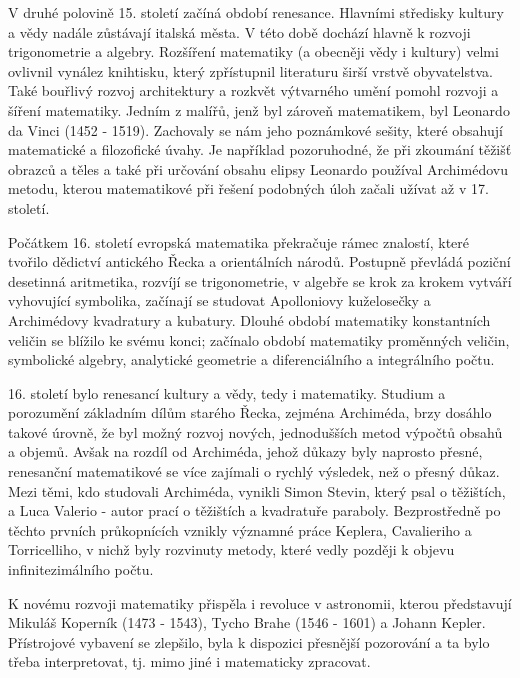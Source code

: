       V druhé polovině 15. století začíná období renesance. Hlavními středisky kultury a vědy nadále
      zůstávají italská města. V této době dochází hlavně k rozvoji trigonometrie a algebry.
      Rozšíření matematiky (a obecněji vědy i kultury) velmi ovlivnil vynález knihtisku, který
      zpřístupnil literaturu širší vrstvě obyvatelstva. Také bouřlivý rozvoj architektury a rozkvět
      výtvarného umění pomohl rozvoji a šíření matematiky. Jedním z malířů, jenž byl zároveň
      matematikem, byl Leonardo da Vinci (1452 - 1519). Zachovaly se nám jeho poznámkové sešity,
      které obsahují matematické a filozofické úvahy. Je například pozoruhodné, že při zkoumání
      těžišť obrazců a těles a také při určování obsahu elipsy Leonardo používal Archimédovu metodu,
      kterou matematikové při řešení podobných úloh začali užívat až v 17. století.

      Počátkem 16. století evropská matematika překračuje rámec znalostí, které tvořilo dědictví
      antického Řecka a orientálních národů. Postupně převládá poziční desetinná aritmetika, rozvíjí
      se trigonometrie, v algebře se krok za krokem vytváří vyhovující symbolika, začínají se
      studovat Apolloniovy kuželosečky a Archimédovy kvadratury a kubatury. Dlouhé období matematiky
      konstantních veličin se blížilo ke svému konci; začínalo období matematiky proměnných veličin,
      symbolické algebry, analytické geometrie a diferenciálního a integrálního počtu.

      16. století bylo renesancí kultury a vědy, tedy i matematiky. Studium a porozumění základním
      dílům starého Řecka, zejména Archiméda, brzy dosáhlo takové úrovně, že byl možný rozvoj
      nových, jednodušších metod výpočtů obsahů a objemů. Avšak na rozdíl od Archiméda, jehož důkazy
      byly naprosto přesné, renesanční matematikové se více zajímali o rychlý výsledek, než o přesný
      důkaz. Mezi těmi, kdo studovali Archiméda, vynikli Simon Stevin, který psal o těžištích, a
      Luca Valerio - autor prací o těžištích a kvadratuře paraboly. Bezprostředně po těchto prvních
      průkopnících vznikly významné práce Keplera, Cavalieriho a Torricelliho, v nichž byly
      rozvinuty metody, které vedly později k objevu infinitezimálního počtu.

      K novému rozvoji matematiky přispěla i revoluce v astronomii, kterou představují Mikuláš
      Koperník (1473 - 1543), Tycho Brahe (1546 - 1601) a Johann Kepler. Přístrojové vybavení se
      zlepšilo, byla k dispozici přesnější pozorování a ta bylo třeba interpretovat, tj. mimo jiné i
      matematicky zpracovat.

